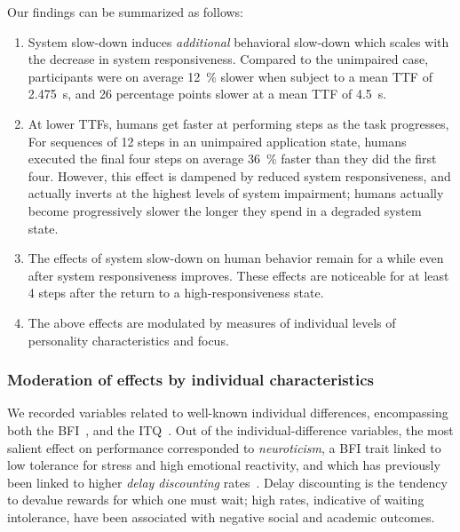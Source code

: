 
Our findings can be summarized as follows:
\begin{enumerate}
    \item System slow-down induces \emph{additional} behavioral slow-down which scales with the decrease in system responsiveness.
    Compared to the unimpaired case, participants were on average \SI{12}{\percent} slower when subject to a mean \ac{TTF} of \SI{2.475}{\second}, and \num{26} percentage points slower at a mean \ac{TTF} of \SI{4.5}{\second}.

    \item\label{item:speedup} At lower \acp{TTF}, humans get faster at performing steps as the task progresses, 
    For sequences of \num{12} steps in an unimpaired application state, humans executed the final four steps on average \SI{36}{\percent} faster than they did the first four.
    However, this effect is dampened by reduced system responsiveness, and actually inverts at the highest levels of system impairment; humans actually become progressively slower the longer they spend in a degraded system state.

    \item\label{item:remain} The effects of system slow-down on human behavior remain for a while even after system responsiveness improves.
    These effects are noticeable for at least \num{4} steps after the return to a high-responsiveness state. 
    
    \item The above effects are modulated by measures of individual levels of personality characteristics and focus.
\end{enumerate}

\subsubsection{Moderation of effects by individual characteristics}\label{ssec:moderationeffects}

We recorded variables related to well-known individual differences, encompassing both the \acf{BFI}~\cite{john1999big}, and the \acf{ITQ}~\cite{witmer1998measuring}.
Out of the individual-difference variables, the most salient effect on performance corresponded to \emph{neuroticism}, a \ac{BFI} trait linked to low tolerance for stress and high emotional reactivity, and which has previously been linked to higher \emph{delay discounting} rates~\cite{hirsh2008delay}.
Delay discounting is the tendency to devalue rewards for which one must wait; high rates, indicative of waiting intolerance, have been associated with negative social and academic outcomes.


